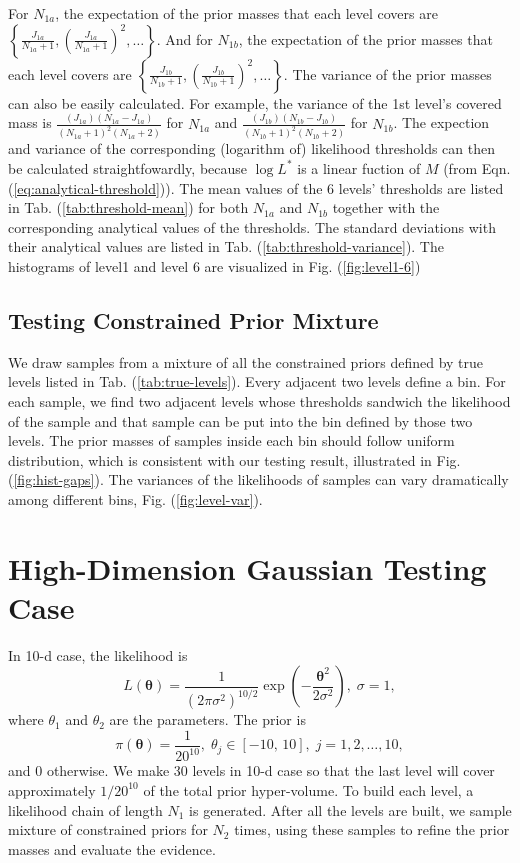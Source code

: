 \documentclass[letterpaper, preprint]{aastex}
\begin{document}
For $N_{1a}$, the expectation of the prior masses that each level covers are $\left\{\frac{J_{1a}}{N_{1a}+1},\left(\frac{J_{1a}}{N_{1a}+1}\right)^2,\ldots\right\}$. And for $N_{1b}$, the expectation of the prior masses that each level covers are $\left\{\frac{J_{1b}}{N_{1b}+1},\left(\frac{J_{1b}}{N_{1b}+1}\right)^2,\ldots\right\}$. The variance of the prior masses can also be easily calculated. For example, the variance of the 1st level's covered mass is $\frac{(J_{1a})(N_{1a}-J_{1a})}{(N_{1a}+1)^2(N_{1a}+2)}$ for $N_{1a}$ and $\frac{(J_{1b})(N_{1b}-J_{1b})}{(N_{1b}+1)^2(N_{1b}+2)}$ for $N_{1b}$. The expection and variance of the corresponding (logarithm of) likelihood thresholds can then be calculated straightfowardly, because $\log{L^*}$ is a linear fuction of $M$ (from Eqn. (\ref{eq:analytical-threshold})). The mean values of the 6 levels' thresholds are listed in Tab. (\ref{tab:threshold-mean}) for both $N_{1a}$ and $N_{1b}$ together with the corresponding analytical values of the thresholds. The standard deviations with their analytical values are listed in Tab. (\ref{tab:threshold-variance}). The histograms of level1 and level 6 are visualized in Fig. (\ref{fig:level1-6})


\subsection{Testing Constrained Prior Mixture}
We draw samples from a mixture of all the constrained priors defined by true levels listed in Tab. (\ref{tab:true-levels}). Every adjacent two levels define a bin. For each sample, we find two adjacent levels whose thresholds sandwich the likelihood of the sample and that sample can be put into the bin defined by those two levels. The prior masses of samples inside each bin should follow uniform distribution, which is consistent with our testing result, illustrated in Fig. (\ref{fig:hist-gaps}). The variances of the likelihoods of samples can vary dramatically among different bins, Fig. (\ref{fig:level-var}).

\section{High-Dimension Gaussian Testing Case}

In 10-d case, the likelihood is
\begin{equation}
L(\boldsymbol{\theta})=\frac{1}{(2\pi\sigma^2)^{10/2}}\exp{\left(-\frac{\boldsymbol{\theta}^2}{2\sigma^2}\right)},\;\sigma = 1,
\label{eq:likelihood10}
\end{equation}
where $\theta_1$ and $\theta_2$ are the parameters. The prior is
\begin{equation}
\pi(\boldsymbol{\theta}) = \frac{1}{20^{10}},\;\theta_j\in[-10,\,10],\;j=1,2,\ldots,10,
\label{eq:prior10}
\end{equation}
and 0 otherwise. We make 30 levels in 10-d case so that the last level will cover approximately $1/20^{10}$ of the total prior hyper-volume. To build each level, a likelihood chain of length $N_1$ is generated. After all the levels are built, we sample mixture of constrained priors for $N_2$ times, using these samples to refine the prior masses and evaluate the evidence.
\end{document}
